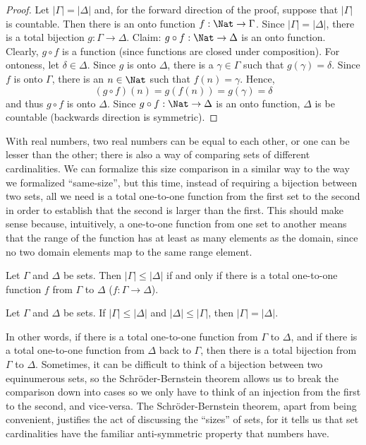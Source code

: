 \documentclass[../../include/open-logic-section]{subfiles}
\begin{document}
\begin{proof}
Let $|\Gamma|=|\Delta|$ and, for the forward direction of the proof, suppose that $|\Gamma|$ is countable. Then there is an onto function $f: \Nat \rightarrow \Gamma$. Since $|\Gamma| = |\Delta|$, there is a total bijection $g: \Gamma \rightarrow \Delta$. Claim: $g \circ f: \Nat \rightarrow \Delta$ is an onto function. Clearly, $g \circ f$ is a function (since functions are closed under composition). For ontoness, let $\delta \in \Delta$. Since $g$ is onto $\Delta$, there is a $\gamma \in \Gamma$ such that $g(\gamma) = \delta$. Since $f$ is onto $\Gamma$, there is an $n\in \Nat$ such that $f(n) = \gamma$. Hence,
\[ (g \circ f)(n) = g(f(n)) = g(\gamma) = \delta \]
and thus $g \circ f$ is onto $\Delta$. Since $g \circ f: \Nat \rightarrow \Delta$ is an onto function, $\Delta$ is be countable (backwards direction is symmetric).
\end{proof}

\begin{explain}
With real numbers, two real numbers can be equal to each other, or one can be lesser than the other; there is also a way of comparing sets of different cardinalities. We can formalize this size comparison in a similar way to the way we formalized ``same-size'', but this time, instead of requiring a bijection between two sets, all we need is a total one-to-one function from the first set to the second in order to establish that the second is larger than the first. This should make sense because, intuitively, a one-to-one function from one set to another means that the range of the function has at least as many elements as the domain, since no two domain elements map to the same range element.
\end{explain}

\begin{defn}
Let $\Gamma$ and $\Delta$ be sets. Then $|\Gamma| \leq |\Delta|$ if and only if there is a total one-to-one function $f$ from $\Gamma$ to $\Delta$ ($f: \Gamma\rightarrow \Delta$).
\end{defn}

\begin{thm}
Let $\Gamma$ and $\Delta$ be sets. If $|\Gamma| \leq |\Delta|$ and $|\Delta| \leq |\Gamma|$, then $|\Gamma| = |\Delta|$. 
\end{thm}

\begin{explain}In other words, if there is a total one-to-one function from $\Gamma$ to $\Delta$, and if there is a total one-to-one function from $\Delta$ back to $\Gamma$, then there is a total bijection from $\Gamma$ to $\Delta$. Sometimes, it can be difficult to think of a bijection between two equinumerous sets, so the Schr\"oder-Bernstein theorem allows us to break the comparison down into cases so we only have to think of an injection from the first to the second, and vice-versa. The Schr\"oder-Bernstein theorem, apart from being convenient, justifies the act of discussing the ``sizes'' of sets, for it tells us that set cardinalities have the familiar anti-symmetric property that numbers have.
\end{explain}
\end{document}
